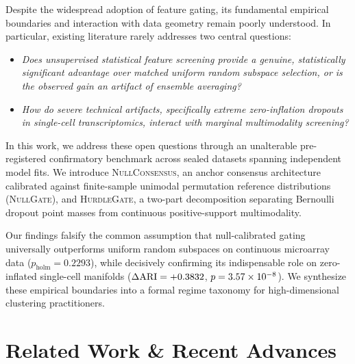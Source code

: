 \documentclass[preprint,12pt]{elsarticle}
\begin{document}
Despite the widespread adoption of feature gating, its fundamental empirical boundaries and interaction with data geometry remain poorly understood. In particular, existing literature rarely addresses two central questions:
\begin{itemize}
    \item \textit{Does unsupervised statistical feature screening provide a genuine, statistically significant advantage over matched uniform random subspace selection, or is the observed gain an artifact of ensemble averaging?}
    \item \textit{How do severe technical artifacts, specifically extreme zero-inflation dropouts in single-cell transcriptomics, interact with marginal multimodality screening?}
\end{itemize}

In this work, we address these open questions through an unalterable pre-registered confirmatory benchmark across \TotalTestDatasets{} sealed datasets spanning \TotalEvaluations{} independent model fits. We introduce \textsc{NullConsensus}, an anchor consensus architecture calibrated against finite-sample unimodal permutation reference distributions (\textsc{NullGate}), and \textsc{HurdleGate}, a two-part decomposition separating Bernoulli dropout point masses from continuous positive-support multimodality.

Our findings falsify the common assumption that null-calibrated gating universally outperforms uniform random subspaces on continuous microarray data ($p_{\text{holm}} = 0.2293$), while decisively confirming its indispensable role on zero-inflated single-cell manifolds ($\Delta\text{ARI} = +0.3832$, $p = 3.57 \times 10^{-8}$). We synthesize these empirical boundaries into a formal regime taxonomy for high-dimensional clustering practitioners.

\section{Related Work \& Recent Advances}\label{sec:related_work}
\end{document}

